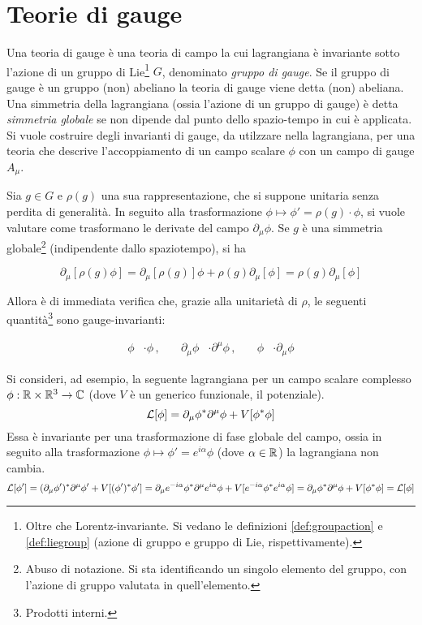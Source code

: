 \chapter{Teorie di gauge}\label{cap:gauge}

Una teoria di gauge è una teoria di campo la cui lagrangiana è invariante sotto
l'azione di un gruppo di Lie\footnote{
   Oltre che Lorentz-invariante.
   Si vedano le definizioni \ref{def:groupaction} e \ref{def:liegroup}
   (azione di gruppo e gruppo di Lie, rispettivamente).
} $G$, denominato \emph{gruppo di gauge}. Se il gruppo di gauge è un gruppo (non)
abeliano la teoria di gauge viene detta (non) abeliana.\\

Una simmetria della lagrangiana (ossia  l'azione di un gruppo di gauge) è detta
\emph{simmetria globale} se non dipende dal punto dello spazio-tempo in cui è applicata.\\

Si vuole costruire degli invarianti di gauge, da utilzzare nella lagrangiana,
per una teoria che descrive l'accoppiamento di un campo scalare $\phi$ con un campo
di gauge $A_\mu$.

Sia $g \in G$ e $\rho(g)$ una sua
rappresentazione, che si suppone unitaria senza perdita di generalità.
In seguito alla trasformazione $\phi \mapsto  \phi' = \rho(g) \cdot \phi$,
si vuole valutare come trasformano le derivate del campo $\partial _\mu \phi$.
Se $g$ è una simmetria globale\footnote{
   Abuso di notazione. Si sta identificando un singolo elemento del gruppo, con
   l'azione di gruppo valutata in quell'elemento.
} (indipendente dallo spaziotempo), si ha

$$
   \partial _\mu [\rho(g) \phi]
      = \partial _\mu [\rho(g)] \phi + \rho(g) \partial _\mu [\phi]
      = \rho(g) \partial _\mu [\phi]
$$

Allora è di immediata verifica che, grazie alla unitarietà di $\rho$, le seguenti
quantità\footnote{Prodotti interni.} sono gauge-invarianti:

\begin{equation*}
   \begin{aligned}
      \phi & \cdot \phi \,,& \quad
      \partial _\mu \phi & \cdot \partial ^\mu \phi \,,& \quad
      \phi & \cdot \partial _\mu \phi
   \end{aligned}
\end{equation*}

Si consideri, ad esempio, la seguente lagrangiana per un campo scalare complesso
$\phi : \mathbb{R} \times \mathbb{R}^3 \to \mathbb{C}$ (dove $V$ è un generico funzionale, il potenziale).
$$
   \mathcal{L} [\phi] = \partial _\mu \phi^*  \partial ^\mu \phi + V[\phi ^* \phi]
$$
Essa è invariante per una trasformazione di fase globale del campo, ossia in seguito
alla trasformazione
$
  \phi \mapsto \phi' = e^{i \alpha}\phi
$
(dove $\alpha \in \mathbb{R}$) la lagrangiana non cambia.
$$
   \mathcal{L} [\phi'] = (\partial _\mu \phi')^*  \partial ^\mu \phi' + V[(\phi')^* \phi']
                = \partial _\mu  e^{-i \alpha}\phi^*  \partial ^\mu  e^{i \alpha}\phi
                   +  V[e^{-i \alpha}\phi ^*  e^{i \alpha}\phi]
                = \partial _\mu \phi^*  \partial ^\mu \phi + V[\phi ^* \phi]
                = \mathcal{L} [\phi]
$$

